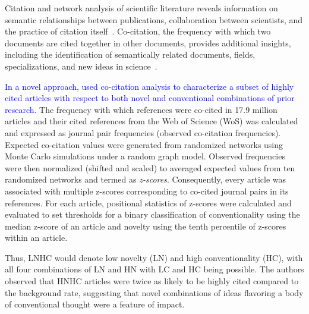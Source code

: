 \documentclass[NETN]{stjour}
\begin{document}
Citation and network analysis of  scientific literature reveals information on semantic relationships between publications, collaboration between scientists, and the practice of citation itself~\citep{garfield_citation_1955,de_solla_price_networks_1965,newman_structure_2001,Shi:2010:CHI:1816123.1816131,patience_pmid28560354,stigler_1994}. Co-citation, the frequency with which two documents are cited together in other documents, provides additional insights, including the identification of semantically related documents, fields, specializations, and new ideas in science~\citep{small_co-citation_1973, marshakova-shaikevich_co-citation_1973,boyack_co-citation_2010, 10.3389/frma.2018.00020}.  

\textcolor{blue} {In a novel approach, \cite{uzzi_atypical_2013} used co-citation analysis to characterize a subset of highly cited articles with respect to both novel and conventional combinations of prior research.} The frequency with which references were co-cited  in 17.9 million articles and their cited references from the Web of Science (WoS) was calculated and expressed as journal pair frequencies (observed co-citation frequencies). Expected co-citation values were generated from randomized networks using Monte Carlo simulations under a random graph model. Observed frequencies were then normalized (shifted and scaled) to averaged expected values from ten randomized networks and termed as \emph{z-scores}. Consequently, every article was associated with multiple z-scores corresponding to co-cited journal pairs in its references. For each article, positional statistics of z-scores were calculated and evaluated to set thresholds for a binary classification of conventionality using the median z-score of an article and novelty using the tenth percentile of z-scores within an article.

Thus, LNHC would denote low novelty (LN) and high conventionality (HC), with all four combinations of LN and HN with LC and HC being possible. The authors observed that HNHC articles were twice as likely to be highly cited compared to the background rate, suggesting that novel combinations of ideas flavoring a body of conventional thought were a feature of impact. 
\end{document}
